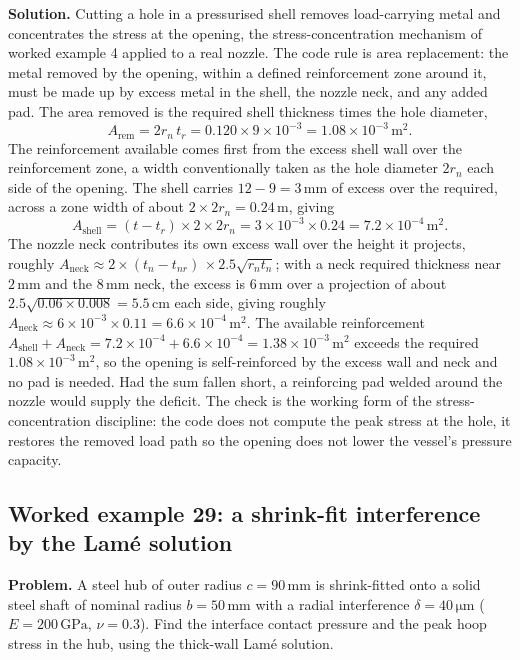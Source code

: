 \textbf{Solution.} Cutting a hole in a pressurised shell removes
load-carrying metal and concentrates the stress at the opening, the
stress-concentration mechanism of worked example 4 applied to a real
nozzle. The code rule is area replacement: the metal removed by the
opening, within a defined reinforcement zone around it, must be made up by
excess metal in the shell, the nozzle neck, and any added pad. The area
removed is the required shell thickness times the hole diameter,
\[
A_{\text{rem}} = 2 r_n\,t_r = 0.120\times 9\times 10^{-3}
= 1.08\times 10^{-3}\,\text{m}^2.
\]
The reinforcement available comes first from the excess shell wall over the
reinforcement zone, a width conventionally taken as the hole diameter
$2 r_n$ each side of the opening. The shell carries $12 - 9 = 3\,\si{
\milli\meter}$ of excess over the required, across a zone width of about
$2\times 2 r_n = 0.24\,\si{\meter}$, giving
\[
A_{\text{shell}} = (t - t_r)\times 2\times 2 r_n
= 3\times 10^{-3}\times 0.24 = 7.2\times 10^{-4}\,\text{m}^2.
\]
The nozzle neck contributes its own excess wall over the height it projects,
roughly $A_{\text{neck}} \approx 2\times (t_n - t_{nr})\,\times 2.5\sqrt{r_n
t_n}$; with a neck required thickness near $2\,\si{\milli\meter}$ and the
$8\,\si{\milli\meter}$ neck, the excess is $6\,\si{\milli\meter}$ over a
projection of about $2.5\sqrt{0.06\times 0.008} = 5.5\,\si{\centi\meter}$
each side, giving roughly $A_{\text{neck}} \approx 6\times 10^{-3}\times
0.11 = 6.6\times 10^{-4}\,\text{m}^2$. The available reinforcement
$A_{\text{shell}} + A_{\text{neck}} = 7.2\times 10^{-4} + 6.6\times 10^{-4}
= 1.38\times 10^{-3}\,\text{m}^2$ exceeds the required $1.08\times 10^{-3}\,
\text{m}^2$, so the opening is self-reinforced by the excess wall and neck
and no pad is needed. Had the sum fallen short, a reinforcing pad welded
around the nozzle would supply the deficit. The check is the working form of
the stress-concentration discipline: the code does not compute the peak
stress at the hole, it restores the removed load path so the opening does
not lower the vessel's pressure capacity.

\subsection*{Worked example 29: a shrink-fit interference by the Lam\'e solution}

\textbf{Problem.} A steel hub of outer radius $c = 90\,\si{\milli\meter}$ is
shrink-fitted onto a solid steel shaft of nominal radius $b = 50\,\si{
\milli\meter}$ with a radial interference $\delta = 40\,\si{\micro\meter}$
($E = 200\,\text{GPa}$, $\nu = 0.3$). Find the interface contact pressure
and the peak hoop stress in the hub, using the thick-wall Lam\'e solution.

